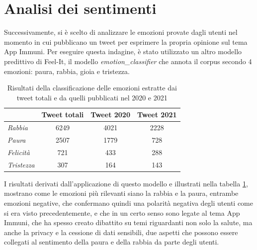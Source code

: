 \section{Analisi dei sentimenti}
Successivamente, si è scelto di analizzare le emozioni provate dagli utenti nel momento in cui pubblicano un tweet per esprimere la propria opinione sul tema App Immuni. Per eseguire questa indagine, è stato utilizzato un altro modello predittivo di Feel-It, il modello \textit{emotion\_classifier} che annota il corpus secondo 4 emozioni: paura, rabbia, gioia e tristezza. 
\begin{table}[H]
\centering
\begin{tabular}{|l|c|c|c|}
\hline
\rowcolor[HTML]{DAE8FC} 
                   & \textbf{Tweet totali} & \textbf{Tweet 2020} & \textbf{Tweet 2021} \\ \hline
\textit{Rabbia}    & 6249                  & 4021                & 2228                \\ \hline
\textit{Paura}     & 2507                  & 1779                & 728                 \\ \hline
\textit{Felicità}  & 721                   & 433                 & 288                 \\ \hline
\textit{Tristezza} & 307                   & 164                 & 143                 \\ \hline
\end{tabular}
\caption{Risultati della classificazione delle emozioni estratte dai tweet totali e da quelli pubblicati nel 2020 e 2021}
\label{tab: emotions}
\end{table}
I risultati derivati dall'applicazione di questo modello e illustrati nella tabella \ref{tab: emotions}, mostrano come le emozioni più rilevanti siano la rabbia e la paura, entrambe emozioni negative, che confermano quindi una polarità negativa degli utenti come si era visto precedentemente, e che in un certo senso sono legate al tema App Immuni, che ha spesso creato dibattito su temi riguardanti non solo la salute, ma anche la privacy e la cessione di dati sensibili, due aspetti che possono essere collegati al sentimento della paura e della rabbia da parte degli utenti. 
